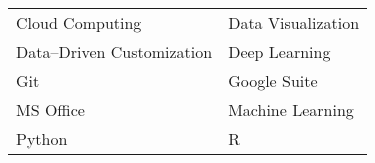 \begin{center}
    \begin{tabular}{ m{5cm} m{5cm} }
        Cloud Computing            &
        Data Visualization           \\
        Data--Driven Customization &
        Deep Learning                \\
        Git                        &
        Google Suite                 \\
        MS Office                  &
        Machine Learning             \\
        Python                     &
        R
    \end{tabular}
\end{center}
